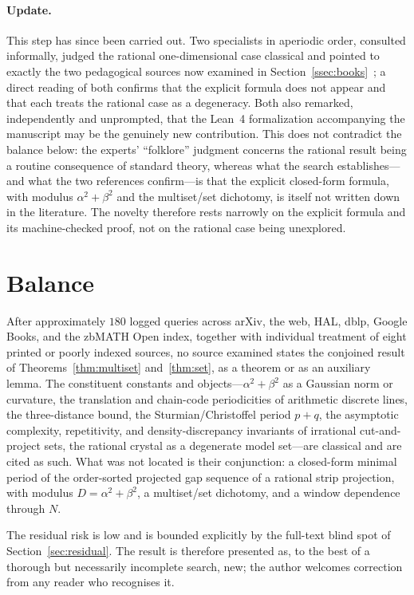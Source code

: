 \documentclass[11pt]{article}
\theoremstyle{plain}
\theoremstyle{remark}
\begin{document}
\paragraph{Update.} This step has since been carried out. Two specialists in
aperiodic order, consulted informally, judged the rational one-dimensional case
classical and pointed to exactly the two pedagogical sources now examined in
Section~\ref{ssec:books}~\cite{HaynesNotes,PytheasFogg2002}; a direct reading of
both confirms that the explicit formula does not appear and that each treats the
rational case as a degeneracy. Both also remarked, independently and unprompted,
that the Lean~4 formalization accompanying the manuscript may be the genuinely
new contribution. This does not contradict the balance below: the experts'
``folklore'' judgment concerns the rational result being a routine consequence
of standard theory, whereas what the search establishes---and what the two
references confirm---is that the explicit closed-form formula, with modulus
$\alpha^2+\beta^2$ and the multiset/set dichotomy, is itself not written down in
the literature. The novelty therefore rests narrowly on the explicit formula
and its machine-checked proof, not on the rational case being unexplored.

\section{Balance}\label{sec:conclusion}

After approximately $180$ logged queries across arXiv, the web, HAL, dblp, Google
Books, and the zbMATH Open index, together with individual treatment of eight printed
or poorly indexed sources, no source examined states the conjoined result of
Theorems~\ref{thm:multiset} and~\ref{thm:set}, as a theorem or as an auxiliary
lemma. The constituent constants and objects---$\alpha^2+\beta^2$ as a Gaussian norm
or curvature, the translation and chain-code periodicities of arithmetic discrete
lines, the three-distance bound, the Sturmian/Christoffel period $p+q$, the
asymptotic complexity, repetitivity, and density-discrepancy invariants of irrational
cut-and-project sets, the rational crystal as a degenerate model set---are classical
and are cited as such. What was
not located is their conjunction: a closed-form minimal period of the order-sorted
projected gap sequence of a rational strip projection, with modulus
$D=\alpha^2+\beta^2$, a multiset/set dichotomy, and a window dependence through $N$.

The residual risk is low and is bounded explicitly by the full-text blind spot of
Section~\ref{sec:residual}. The result is therefore presented as, to the best of a
thorough but necessarily incomplete search, new; the author welcomes correction from
any reader who recognises it.
\end{document}
